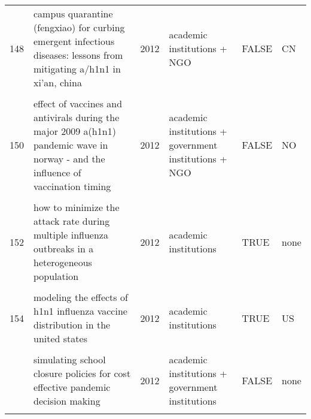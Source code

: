 \documentclass[
]{article}
\begin{document}
\begin{landscape}
\begin{longtable}{l>{\raggedright\arraybackslash}p{4cm}l>{\raggedright\arraybackslash}p{3.5cm}l>{\raggedright\arraybackslash}p{1.5cm}}
148 & campus quarantine (fengxiao) for curbing emergent infectious diseases: lessons from mitigating a/h1n1 in xi'an, china & 2012 & academic institutions + NGO & FALSE & CN\\
\cellcolor{gray!6}{149} & \cellcolor{gray!6}{dynamic modelling of costs and health consequences of school closure during an influenza pandemic} & \cellcolor{gray!6}{2012} & \cellcolor{gray!6}{academic institutions + government institutions} & \cellcolor{gray!6}{FALSE} & \cellcolor{gray!6}{NO}\\
150 & effect of vaccines and antivirals during the major 2009 a(h1n1) pandemic wave in norway - and the influence of vaccination timing & 2012 & academic institutions + government institutions + NGO & FALSE & NO\\
\addlinespace
\cellcolor{gray!6}{151} & \cellcolor{gray!6}{estimating the value of containment strategies in delaying the arrival time of an influenza pandemic: a case study of travel restriction and patient isolation} & \cellcolor{gray!6}{2012} & \cellcolor{gray!6}{academic institutions} & \cellcolor{gray!6}{TRUE} & \cellcolor{gray!6}{none}\\
152 & how to minimize the attack rate during multiple influenza outbreaks in a heterogeneous population & 2012 & academic institutions & TRUE & none\\
\cellcolor{gray!6}{153} & \cellcolor{gray!6}{modeling strategies for controlling h1n1 outbreaks in china} & \cellcolor{gray!6}{2012} & \cellcolor{gray!6}{academic institutions} & \cellcolor{gray!6}{TRUE} & \cellcolor{gray!6}{CN}\\
154 & modeling the effects of h1n1 influenza vaccine distribution in the united states & 2012 & academic institutions & TRUE & US\\
\cellcolor{gray!6}{155} & \cellcolor{gray!6}{modeling the impact of air, sea, and land travel restrictions supplemented by other interventions on the emergence of a new influenza pandemic virus} & \cellcolor{gray!6}{2012} & \cellcolor{gray!6}{academic institutions} & \cellcolor{gray!6}{TRUE} & \cellcolor{gray!6}{HK}\\
\addlinespace
156 & simulating school closure policies for cost effective pandemic decision making & 2012 & academic institutions + government institutions & FALSE & none\\
\cellcolor{gray!6}{157} & \cellcolor{gray!6}{the impact of school closures on pandemic influenza: assessing potential repercussions using a seasonal sir model} & \cellcolor{gray!6}{2012} & \cellcolor{gray!6}{academic institutions} & \cellcolor{gray!6}{TRUE} & \cellcolor{gray!6}{none}\\

\end{longtable}
\end{landscape}
\end{document}
